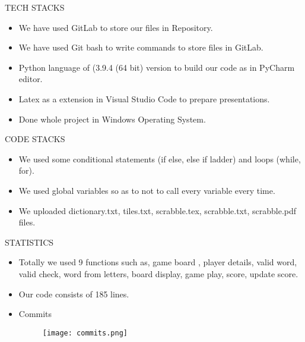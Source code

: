 \documentclass[13.5pt]{beamer}
\begin{document}
\begin{frame}{TECH STACKS}

\begin{itemize}

\item We have used GitLab to store our files in Repository.

\item We have used Git bash to write commands to store files in GitLab.

\item Python language of (3.9.4 (64 bit) version to build our code as in PyCharm editor.

\item Latex as a extension in Visual Studio Code to prepare presentations.

\item Done whole project in Windows Operating System.
\end{itemize}
   
\end{frame}


\begin{frame}{CODE STACKS}
    \begin{itemize}
        \item We used some conditional statements (if else, else if ladder) and loops (while, for).
        \item We used global variables so as to not to call every variable every time.
        \item We uploaded dictionary.txt, tiles.txt, scrabble.tex, scrabble.txt, scrabble.pdf files. 
    \end{itemize}
\end{frame}

\begin{frame}{STATISTICS}
\begin{itemize}
    \item Totally we used 9 functions such as, game board
, player details, valid word, valid check, word from letters, board display, game play, score, update score.
\item Our code consists of 185 lines.
\item Commits
\begin{figure}[htp]
    \centering
    \texttt{[image: commits.png]}
    \label{fig:commits}
\end{figure}
\end{itemize}
    
\end{frame}
\end{document}
